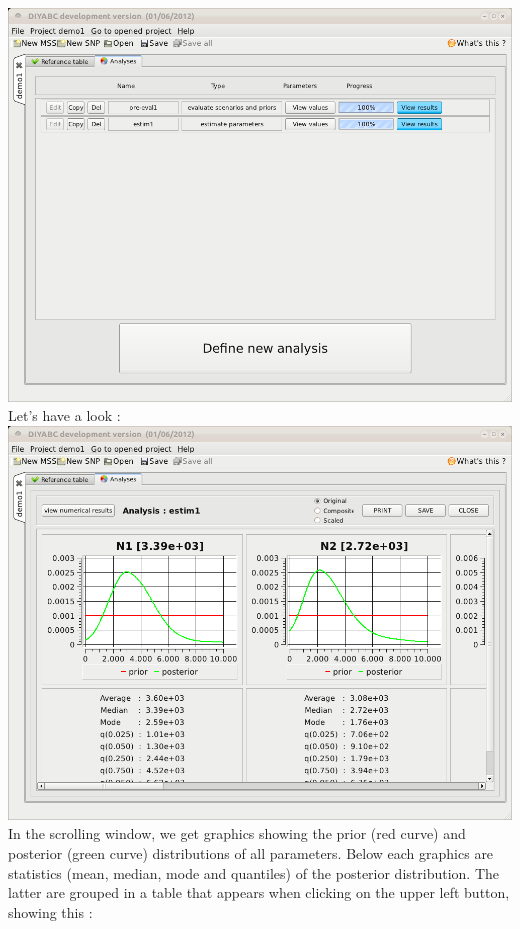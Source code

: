 \includegraphics[scale=0.35]{gui_pictures/Capture-DIYABC-39} \\


Let's have a look :\\


\includegraphics[scale=0.35]{gui_pictures/Capture-DIYABC-40} \\


In the scrolling window, we get graphics showing the prior (red curve)
and posterior (green curve) distributions of all parameters. Below
each graphics are statistics (mean, median, mode and quantiles) of
the posterior distribution. The latter are grouped in a table that
appears when clicking on the upper left  button, showing this :\\


